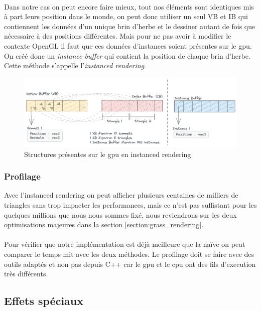 \documentclass[11pt]{article} %
\begin{document}
\paragraph{}
Dans notre cas on peut encore faire mieux, tout nos éléments sont identiques mis à part leurs position dans le monde, on peut donc utiliser un seul VB et IB qui contiennent les données d'un unique brin d'herbe et le dessiner autant de fois que nécessaire à des positions différentes. Mais pour ne pas avoir à modifier le contexte OpenGL il faut que ces données d'instances soient présentes sur le gpu. On créé donc un \textit{instance buffer} qui contient la position de chaque brin d'herbe. Cette méthode s'appelle l'\textit{instanced rendering}.

\begin{figure}[h]
	\centering
	\includegraphics[scale=.4]{grass_vbibib}
	\caption{Structures présentes sur le gpu en instanced rendering}
	\label{fig:grass_vbibib}
\end{figure}

\subsubsection{Profilage}
Avec l'instanced rendering on peut afficher plusieurs centaines de milliers de triangles sans trop impacter les performances, mais ce n'est pas suffistant pour les quelques millions que nous nous sommes fixé, nous reviendrons sur les deux optimisations majeures dans la section \ref{section:grass_rendering}.
\paragraph{}
 Pour vérifier que notre implémentation est déjà meilleure que la naïve on peut comparer le temps mit avec les deux méthodes. Le profilage doit se faire avec des outils adaptés et non pas depuis C++ car le gpu et le cpu ont des fils d'execution très différents.


\subsection{Effets spéciaux}
\end{document}
